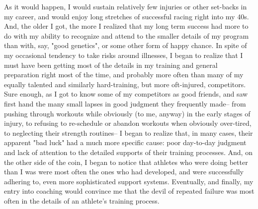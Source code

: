As it would happen, I would sustain relatively few injuries or other set-backs in my career, and would enjoy long stretches of successful racing right into my 40s. And, the older I got, the more I realized that my long term success had more to do with my ability to recognize and attend to the smaller details of my program than with, say, "good genetics", or some other form of happy chance. In spite of my occasional tendency to take risks around illnesses, I began to realize that I must have been getting most of the details in my training and general preparation right most of the time, and probably more often than many of my equally talented and similarly hard-training, but more oft-injured, competitors. Sure enough, as I got to know some of my competitors as good friends, and saw first hand the many small lapses in good judgment they frequently made-- from pushing through workouts while obviously (to me, anyway) in the early stages of injury, to refusing to re-schedule or abandon workouts when obviously over-tired, to neglecting their strength routines-- I began to realize that, in many cases, their apparent "bad luck" had a much more specific cause: poor day-to-day judgment and lack of attention to the detailed supports of their training processes. And, on the other side of the coin, I began to notice that athletes who were doing better than I was were most often the ones who had developed, and were successfully adhering to, even more sophisticated support systems. Eventually, and finally, my entry into coaching would convince me that the devil of repeated failure was most often in the details of an athlete's training process.

